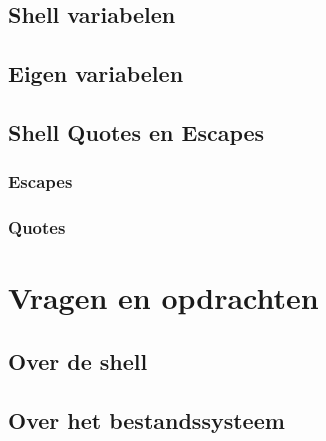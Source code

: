 \documentclass[a4paper,12pt,twoside,openright,titlepage]{article}
\begin{document}
\subsection{Shell variabelen}

\subsection{Eigen variabelen}


\subsection{Shell Quotes en Escapes}

\subsubsection{Escapes}

\subsubsection{Quotes}


%

%

\section{Vragen en opdrachten}
\subsection{Over de shell}

\subsection{Over het bestandssysteem}


\printindex
\end{document}
